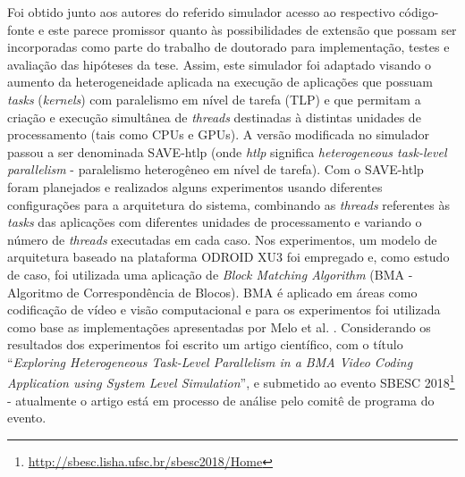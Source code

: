 \documentclass[tese-proposta,nocipinfo]{texufpel}
\begin{document}
Foi obtido junto aos autores do referido simulador \cite{miele2015system} acesso ao respectivo código-fonte e este parece promissor quanto às possibilidades de extensão que possam ser incorporadas como parte do trabalho de doutorado para implementação, testes e avaliação das hipóteses da tese. Assim, este simulador foi adaptado visando o aumento da heterogeneidade aplicada na execução de aplicações que possuam \textit{tasks} (\textit{kernels}) com paralelismo em nível de tarefa (TLP) e que permitam a criação e execução simultânea de \textit{threads} destinadas à distintas unidades de processamento (tais como CPUs e GPUs). A versão modificada no simulador passou a ser denominada SAVE-htlp (onde \textit{htlp} significa \textit{heterogeneous task-level parallelism} - paralelismo heterogêneo em nível de tarefa). Com o SAVE-htlp foram planejados e realizados alguns experimentos usando diferentes configurações para a arquitetura do sistema, combinando as \textit{threads} referentes às \textit{tasks} das aplicações com diferentes unidades de processamento e variando o número de \textit{threads} executadas em cada caso. Nos experimentos, um modelo de arquitetura baseado na plataforma ODROID XU3 \cite{HardKernel_Odroid_XU3} foi empregado e, como estudo de caso, foi utilizada uma aplicação de \textit{Block Matching Algorithm} (BMA - Algoritmo de Correspondência de Blocos). BMA é aplicado em áreas como codificação de vídeo e visão computacional e para os experimentos foi utilizada como base as implementações apresentadas por Melo et al. \cite{melo2016parallel}. Considerando os resultados dos experimentos foi escrito um artigo científico, com o título “\textit{Exploring Heterogeneous Task-Level Parallelism in a BMA Video Coding Application using System Level Simulation}”, e submetido ao evento SBESC 2018\footnote{\url{http://sbesc.lisha.ufsc.br/sbesc2018/Home}} - atualmente o artigo está em processo de análise pelo comitê de programa do evento.



\end{document}
